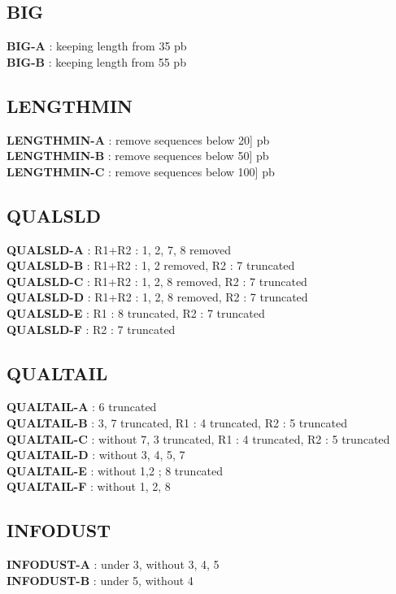 \documentclass{article}
\begin{document}
\subsection{BIG}
\textbf{BIG-A} : keeping length from 35 pb\\
\textbf{BIG-B} : keeping length from 55 pb

\subsection{LENGTHMIN}
\textbf{LENGTHMIN-A} : remove sequences below 20] pb\\
\textbf{LENGTHMIN-B} : remove sequences below 50] pb\\
\textbf{LENGTHMIN-C} : remove sequences below 100] pb

\subsection{QUALSLD}
\textbf{QUALSLD-A} : R1+R2 : 1, 2, 7, 8 removed\\
\textbf{QUALSLD-B} : R1+R2 : 1, 2 removed, R2 : 7 truncated\\
\textbf{QUALSLD-C} : R1+R2 : 1, 2, 8 removed, R2 : 7 truncated\\
\textbf{QUALSLD-D} : R1+R2 : 1, 2, 8 removed, R2 : 7 truncated\\
\textbf{QUALSLD-E} : R1 : 8 truncated, R2 : 7 truncated\\
\textbf{QUALSLD-F} : R2 : 7 truncated

\subsection{QUALTAIL}
\textbf{QUALTAIL-A} : 6 truncated\\
\textbf{QUALTAIL-B} : 3, 7 truncated, R1 : 4 truncated, R2 : 5 truncated\\
\textbf{QUALTAIL-C} : without 7, 3 truncated, R1 : 4 truncated, R2 : 5 truncated\\
\textbf{QUALTAIL-D} : without 3, 4, 5, 7\\
\textbf{QUALTAIL-E} : without 1,2 ; 8 truncated\\
\textbf{QUALTAIL-F} : without 1, 2, 8\\

\subsection{INFODUST}
\textbf{INFODUST-A} : under 3, without 3, 4, 5\\
\textbf{INFODUST-B} : under 5, without 4
    
\end{document}
